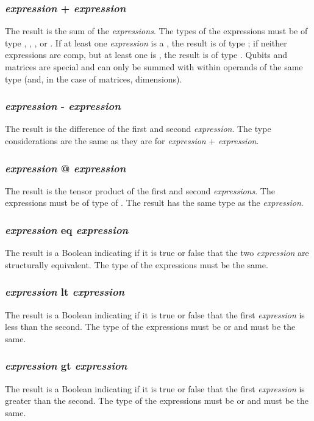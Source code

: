 \subsubsection{\textit{expression} + \textit{expression}}
The result is the sum of the \textit{expressions}. The types of the expressions must be of type \integ, \float, \complex, or \mat. If at least one \textit{expression} is a \complex, the result is of type \complex; if neither expressions are comp, but at least one is \float, the result is of type \float. Qubits and matrices are special and can only be summed with within operands of the same type (and, in the case of matrices, dimensions).
\subsubsection{\textit{expression} - \textit{expression}}
The result is the difference of the first and second \textit{expression}. The type considerations are the same as they are for \textit{expression} + \textit{expression}.
\subsubsection{\textit{expression} @ \textit{expression}}
The result is the tensor product of the first and second \textit{expressions}. The expressions must be of type of \mat. The result has the same type as the \textit{expression}.
\subsubsection{\textit{expression} eq \textit{expression}}
The result is a Boolean indicating if it is true or false that the two \textit{expression} are structurally equivalent. The type of the expressions must be the same.
\subsubsection{\textit{expression} lt \textit{expression}}
The result is a Boolean indicating if it is true or false that the first \textit{expression} is less than the second. The type of the expressions must be \integ or \float and must be the same.  
\subsubsection{\textit{expression} gt \textit{expression}}
The result is a Boolean indicating if it is true or false that the first \textit{expression} is greater than the second. The type of the expressions must be \integ or \float and must be the same.  
